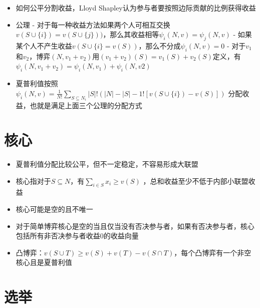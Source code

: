 \documentclass[]{book}
\providecommand{\tightlist}{%
  \setlength{\itemsep}{0pt}\setlength{\parskip}{0pt}}
\begin{document}
\begin{itemize}
\item
  如何公平分割收益，Lloyd Shapley认为参与者要按照边际贡献的比例获得收益
\item
  公理
  - 对于每一种收益方法如果两个人可相互交换\(v(S\cup \{i\}) = v(S\cup \{j\}))\)，那么其收益相等\(\psi_i(N,v)=\psi_j(N,v)\)
  - 如果某个人不产生收益\(v(S\cup \{i\} = v(S))\)，那么不分成\(\psi_i(N,v)=0\)
  - 对于\(v_1\)和\(v_2\)，博弈\((N,v_1+v_2)\)用\((v_1+v_2)(S)=v_1(S)+v_2(S)\)定义，有\(\psi_i(N,v_1+v_2)=\psi_i(N,v_1)+\psi_i(N,v2)\)
\item
  夏普利值按照 \(\psi_i(N,v) = \frac{1}{N!}\sum_{S\subseteq N_i} |S|!(|N|-|S|-1![v(S\cup \{i\})-v(S)])\) 分配收益，也就是满足上面三个公理的分配方式
\end{itemize}

\hypertarget{ux6838ux5fc3}{%
\section{核心}\label{ux6838ux5fc3}}

\begin{itemize}
\tightlist
\item
  夏普利值分配比较公平，但不一定稳定，不容易形成大联盟
\item
  核心指对于\(S\subseteq N\)，有\(\sum_{i\in S} x_i \geq v(S)\) ，总和收益至少不低于内部小联盟收益
\item
  核心可能是空的且不唯一
\item
  对于简单博弈核心是空的当且仅当没有否决参与者，如果有否决参与者，核心包括所有非否决参与者收益0的收益向量
\item
  凸博弈：\(v(S\cup T)\geq v(S)+v(T)-v(S\cap T)\)，每个凸博弈有一个非空核心且是夏普利值
\end{itemize}

\hypertarget{ux9009ux4e3e}{%
\section{选举}\label{ux9009ux4e3e}}
\end{document}
